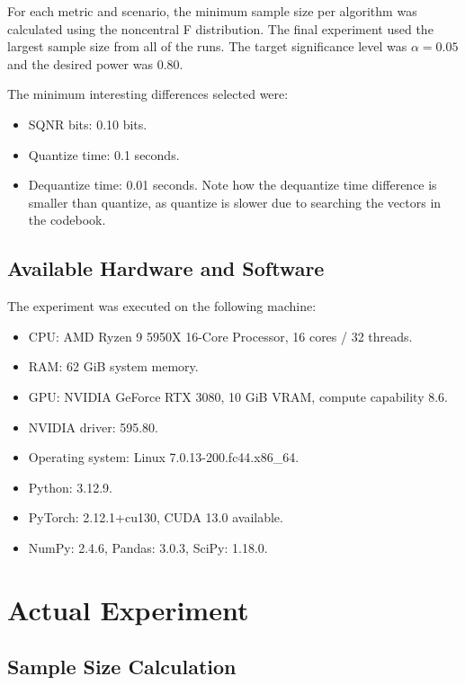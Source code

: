 \documentclass[11pt]{article}
\begin{document}
For each metric and scenario, the minimum sample size per algorithm was calculated using the noncentral F distribution.
The final experiment used the largest sample size from all of the runs.
The target significance level was $\alpha = 0.05$ and the desired power was $0.80$.

The minimum interesting differences selected were:

\begin{itemize}
    \item SQNR bits: 0.10 bits.
    \item Quantize time: 0.1 seconds.
    \item Dequantize time: 0.01 seconds. Note how the dequantize time difference is smaller than quantize, as quantize is slower due to searching the vectors in the codebook.
\end{itemize}

\subsection{Available Hardware and Software}

The experiment was executed on the following machine:

\begin{itemize}
    \item CPU: AMD Ryzen 9 5950X 16-Core Processor, 16 cores / 32 threads.
    \item RAM: 62 GiB system memory.
    \item GPU: NVIDIA GeForce RTX 3080, 10 GiB VRAM, compute capability 8.6.
    \item NVIDIA driver: 595.80.
    \item Operating system: Linux 7.0.13-200.fc44.x86\_64.
    \item Python: 3.12.9.
    \item PyTorch: 2.12.1+cu130, CUDA 13.0 available.
    \item NumPy: 2.4.6, Pandas: 3.0.3, SciPy: 1.18.0.
\end{itemize}

\section{Actual Experiment}

\subsection{Sample Size Calculation}
\end{document}
